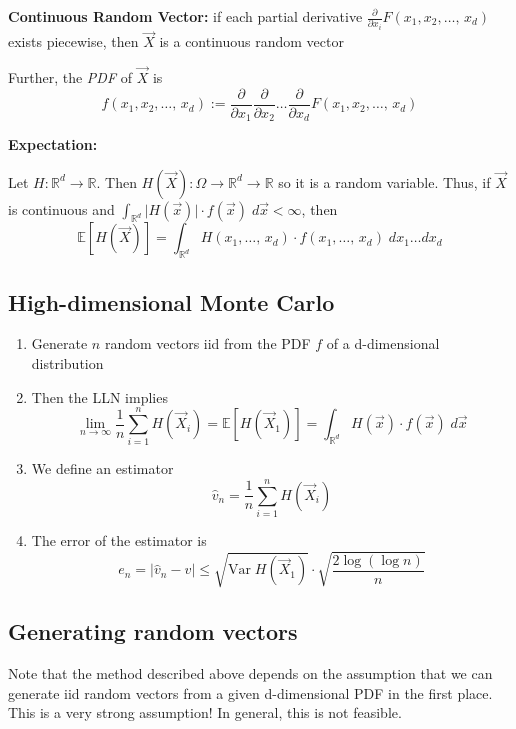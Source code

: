 \documentclass[12pt]{article}
\renewcommand{\hat}[1]{\widehat{#1}}
\newcommand{\R}{\mathbb{R}}
\newcommand{\E}{\mathbb{E}}
\newcommand{\Var}{\text{Var}\;}
\begin{document}
\textbf{Continuous Random Vector:} if each partial derivative $\frac{\partial}{\partial x_i} F(x_1, x_2, \dots,\, x_d)$ exists piecewise, then $\vec X$ is a continuous random vector 

Further, the \emph{PDF} of $\vec X$ is 
\[f(x_1, x_2, \dots,\, x_d) := \frac{\partial}{\partial x_1} \frac{\partial}{\partial x_2} \dots \frac{\partial}{\partial x_d} F(x_1, x_2, \dots,\, x_d)\]

\textbf{Expectation:}

Let $H : \R^d \to \R$. Then $H(\vec{X}): \Omega \to \R^d \to \R$ so it is a random variable. Thus, if $\vec X$ is continuous and $\int_{\R^d} \big\vert H(\vec x) \big \vert \cdot f(\vec x) \; d\vec x < \infty$, then 
\[\E[H(\vec X)] = \int_{\R^d} H(x_1, \dots,\, x_d) \cdot f(x_1, \dots, \, x_d)\; dx_1 \dots dx_d\]

\subsection*{High-dimensional Monte Carlo}
\begin{enumerate}
    \item Generate $n$ random vectors iid from the PDF $f$ of a d-dimensional distribution 
    
    \item Then the LLN implies 
    \[\lim_{n\to \infty} \frac{1}{n} \sum_{i=1}^n H(\vec X_i) = \E[H(\vec X_1)] = \int_{\R^d} H(\vec x) \cdot f(\vec x) \; d\vec x\]

    \item We define an estimator 
    \[\hat v_n = \frac{1}{n} \sum_{i=1}^n H(\vec X_i)\]

    \item The error of the estimator is 
    \[e_n = \big\vert \hat v_n - v \big\vert \leq \sqrt{\Var H(\vec X_1)}\cdot \sqrt{\frac{2\log(\log n)}{n}}\]
\end{enumerate}

\subsection*{Generating random vectors}
Note that the method described above depends on the assumption that we can generate iid random vectors from a given d-dimensional PDF in the first place. This is a very strong assumption! In general, this is not feasible. 
\end{document}
